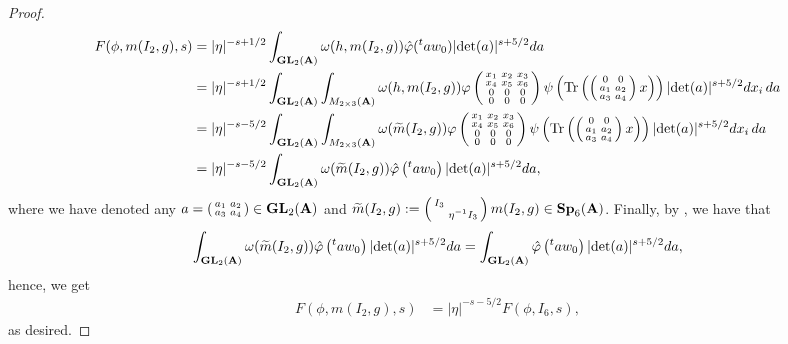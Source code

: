 \documentclass[11pt, reqno]{amsart}
\theoremstyle{plain}
\theoremstyle{definition}
\theoremstyle{remark}
\theoremstyle{plain}
\def\A{{\bf A}}
\def\det{\mathrm{det}}
\def\Sp{{\mathbf{Sp}}}
\def\GL{\mathbf{GL}}
\begin{document}
\begin{proof}
\begin{align*}
        F(\phi,m(I_2,g),s) &= | \eta |^{-s+1/2}  \int_{\GL_2(\A)}\omega(h,m(I_2,g))\hat{\varphi}
    (^{t}a w_0)|\det(a)|^{s+5/2}da \\ &= | \eta |^{-s+1/2} \int_{\GL_2(\A)}\int_{M_{2\times 3}(\A)}\omega(h,m(I_2,g))\varphi\left(\begin{smallmatrix}x_1&x_2&x_3\\ x_4&x_5&x_6\\ 0& 0& 0\\ 0& 0& 0\end{smallmatrix}\right)\psi\left(\mathrm{Tr}\left(\left(\begin{smallmatrix}0&0\\a_1&a_2\\ a_3& a_4\end{smallmatrix}\right)x\right)\right)|\det(a)|^{s+5/2}dx_i \,da \\ &= | \eta |^{-s-5/2} \int_{\GL_2(\A)}\int_{M_{2\times 3}(\A)}\omega(\widetilde{m}(I_2,g))\varphi\left(\begin{smallmatrix}x_1&x_2&x_3\\ x_4&x_5&x_6\\ 0& 0& 0\\ 0& 0 & 0\end{smallmatrix}\right)\psi\left(\mathrm{Tr}\left(\left(\begin{smallmatrix}0&0\\a_1&a_2\\ a_3& a_4\end{smallmatrix}\right)x\right)\right)|\det(a)|^{s+5/2}dx_i \,da \\ 
    &= | \eta |^{-s-5/2}\int_{\GL_2(\A)} \omega(\widetilde{m}(I_2,g))\hat{\varphi}
        \left({}^{t}aw_0\right)|\det(a)|^{s+5/2}da,
    \end{align*} 
    where we have denoted any $a = \left(\begin{smallmatrix}a_1&a_2\\a_3&a_4\end{smallmatrix}\right)\in \GL_2(\A)$ and $\widetilde{m}(I_2,g) := \left(\begin{smallmatrix}I_3& \\ &\eta^{-1}I_3\end{smallmatrix}\right) m(I_2,g)\in \Sp_6(\A)$. Finally, by \cite[(5.5.15)]{KudlaRallis}, we have that \[\int_{\GL_2(\A)} \omega(\widetilde{m}(I_2,g))\hat{\varphi}
        \left( {}^{t}aw_0\right)|\det(a)|^{s+5/2}da = \int_{\GL_2(\A)} \hat{\varphi}
        \left({}^{t}aw_0\right)|\det(a)|^{s+5/2}da,\]
        hence, we get \begin{align*}
      F(\phi,m(I_2,g),s) &= |\eta|^{- s - 5/2}F(\phi,I_6,s),
    \end{align*}
    as desired.
\end{proof}
\end{document}
